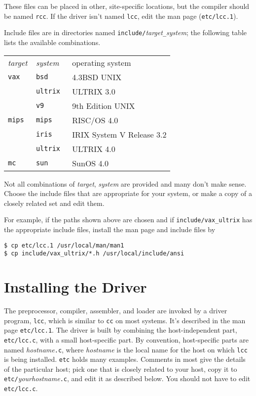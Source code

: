 These files can be placed in other, site-specific locations,
but the compiler should be named \verb|rcc|.
If the driver isn't named \verb|lcc|, edit the man page (\verb|etc/lcc.1|).

Include files are in directories named \verb|include/|{\it target}\verb|_|{\it system};
the following table lists the available combinations.
\begin{center}
\begin{tabular}{lll}
\em target	& \em system	& operating system \\[0.5ex]
\tt vax		& \tt bsd 	& 4.3BSD UNIX \\
		& \tt ultrix	& ULTRIX 3.0 \\
		& \tt v9	& 9th Edition UNIX \\
\tt mips	& \tt mips	& RISC/OS 4.0 \\
		& \tt iris	& IRIX System V Release 3.2 \\
		& \tt ultrix	& ULTRIX 4.0 \\
\tt mc		& \tt sun	& SunOS 4.0 \\
\end{tabular}
\end{center}
Not all combinations of {\it target}, {\it system\/} are provided
and many don't make sense.
Choose the include files that are appropriate for your system,
or make a copy of a closely related set and edit them.

For example, if the paths shown above are chosen and if
\verb|include/vax_ultrix| has the appropriate include files,
install the man page and include files by
\begin{verbatim}
$ cp etc/lcc.1 /usr/local/man/man1
$ cp include/vax_ultrix/*.h /usr/local/include/ansi
\end{verbatim}

\section{Installing the Driver}\label{driver}

The preprocessor, compiler, assembler, and loader are
invoked by a driver program, \verb|lcc|, which is similar
to \verb|cc| on most systems. It's described in the man page
\verb|etc/lcc.1|.
The driver is built by combining the host-independent
part, \verb|etc/lcc.c|, with a small host-specific part.
By convention, host-specific parts are named {\it hostname}\verb|.c|,
where {\it hostname\/} is the local name for the host on which \verb|lcc|
is being installed. \verb|etc| holds many examples.
Comments in most give the details of the
particular host; pick one that is closely related to your host,
copy it to \verb|etc/|{\it yourhostname}\verb|.c|,
and edit it as described below.
You should not have to edit \verb|etc/lcc.c|.

